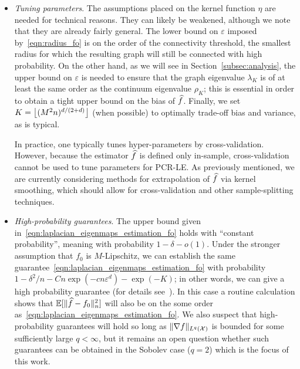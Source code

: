 \begin{itemize}
	\item \emph{Tuning parameters}. The assumptions placed on the kernel function $\eta$ are needed for technical reasons. They can likely be weakened, although we note that they are already fairly general. The lower bound on $\varepsilon$ imposed by~\eqref{eqn:radius_fo} is on the order of the connectivity threshold, the smallest radius for which the resulting graph will still be connected with high probability. On the other hand, as we will see in Section~\ref{subsec:analysis}, the upper bound on $\varepsilon$ is needed to ensure that the graph eigenvalue $\lambda_K$ is of at least the same order as the continuum eigenvalue $\rho_K$; this is essential in order to obtain a tight upper bound on the bias of $\widehat{f}$.  Finally, we set $K = \left\lfloor (M^2n)^{d/(2 + d)} \right\rfloor$ (when possible) to optimally trade-off bias and variance, as is typical.
	
	In practice, one typically tunes hyper-parameters by cross-validation. However, because the estimator $\widehat{f}$ is defined only in-sample, cross-validation cannot be used to tune parameters for PCR-LE. As previously mentioned, we are currently considering methods for extrapolation of $\widehat{f}$ via kernel smoothing, which should allow for cross-validation and other sample-splitting techniques.
	
	
	\item \emph{High-probability guarantees}. The upper bound given in~\eqref{eqn:laplacian_eigenmaps_estimation_fo} holds with ``constant probability'', meaning with probability $1 - \delta - o(1)$. Under the stronger assumption that $f_0$ is $M$-Lipschitz, we can establish the same guarantee~\eqref{eqn:laplacian_eigenmaps_estimation_fo} with probability $1 - \delta^2/n - Cn\exp(-cn\varepsilon^d) - \exp(-K)$; in other words, we can give a high probability guarantee (for details see~\cite{green2021}). In this case a routine calculation shows that $\mathbb{E}[\|\widehat{f} - f_0\|_n^2]$ will also be on the some order as~\eqref{eqn:laplacian_eigenmaps_estimation_fo}. We also suspect that high-probability guarantees will hold so long as $\|\nabla f\|_{L^q(\mathcal{X})}$ is bounded for some sufficiently large $q < \infty$, but it remains an open question whether such guarantees can be obtained in the Sobolev case ($q = 2$) which is the focus of this work. 
\end{itemize}

